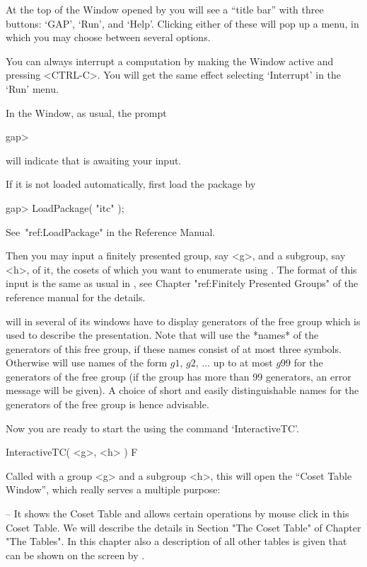 At the top of the {\GAP} Window opened by {\XGAP} you will see a
``title bar'' with three buttons: `GAP', `Run', and `Help'. Clicking
either of these will pop up a menu, in which you may choose between
several options.

You can always interrupt a computation by making the {\GAP} Window
active and pressing <CTRL-C>. You will get the same effect selecting
`Interrupt' in the `Run' menu.

In the {\GAP} Window, as usual, the {\GAP} prompt

\begintt
gap>
\endtt

will indicate that {\GAP} is awaiting your input.

If it is not loaded automatically, first load the {\ITC} package by

\begintt
gap> LoadPackage( "itc" );
\endtt

See~"ref:LoadPackage" in the {\GAP} Reference Manual.

Then you may input a finitely presented group, say <g>, and a
subgroup, say <h>, of it, the cosets of which you want to enumerate
using {\ITC}. The format of this input is the same as usual in {\GAP},
see Chapter "ref:Finitely Presented Groups" of the {\GAP} reference
manual for the details.

{\ITC} will in several of its windows have to display generators of
the free group which is used to describe the presentation. Note that
{\ITC} will use the *names* of the generators of this free group, if
these names consist of at most three symbols. Otherwise {\ITC} will
use names of the form $g1$, $g2$, ... up to at most $g99$ for the
generators of the free group (if the group has more than 99
generators, an error message will be given). A choice of short and
easily distinguishable names for the generators of the free group is
hence advisable.

Now you are ready to start the {\ITC} using the command `InteractiveTC'.

\>InteractiveTC( <g>, <h> ) F

Called with a group <g> and a subgroup <h>,
this will open the ``Coset Table Window'', which really serves a
multiple purpose:

\beginlist

\item{--}
  It shows the Coset Table and allows certain operations by mouse click
  in this Coset Table. We will describe the details in Section "The
  Coset Table" of Chapter "The Tables". In this chapter also a
  description of all other tables is given that can be shown on the
  screen by {\ITC}.

